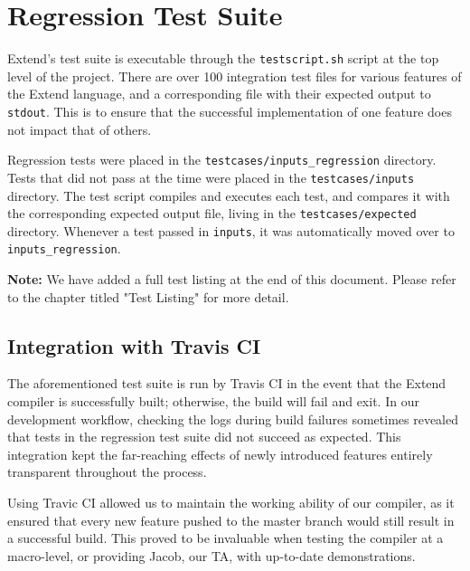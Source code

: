 \section{Regression Test Suite}
Extend's test suite is executable through the \texttt{testscript.sh} script at the top level of the project. There are over 100 integration test files for various features of the Extend language, and a corresponding file with their expected output to \texttt{stdout}. This is to ensure that the successful implementation of one feature does not impact that of others.

\medskip \noindent
Regression tests were placed in the \texttt{testcases/inputs\_regression} directory. Tests that did not pass at the time were placed in the \texttt{testcases/inputs} directory. The test script compiles and executes each test, and compares it with the corresponding expected output file, living in the \texttt{testcases/expected} directory. Whenever a test passed in \texttt{inputs}, it was automatically moved over to \texttt{inputs\_regression}.


\medskip \noindent
\textbf{Note:} We have added a full test listing at the end of this document. Please refer to the chapter titled "Test Listing" for more detail.

  \subsection{Integration with Travis CI}
  The aforementioned test suite is run by Travis CI in the event that the Extend compiler is successfully built; otherwise, the build will fail and exit. In our development workflow, checking the logs during build failures sometimes revealed that tests in the regression test suite did not succeed as expected. This integration kept the far-reaching effects of newly introduced features entirely transparent throughout the process.

  \medskip \noindent
  Using Travic CI allowed us to maintain the working ability of our compiler, as it ensured that every new feature pushed to the master branch would still result in a successful build. This proved to be invaluable when testing the compiler at a macro-level, or providing Jacob, our TA, with up-to-date demonstrations.
